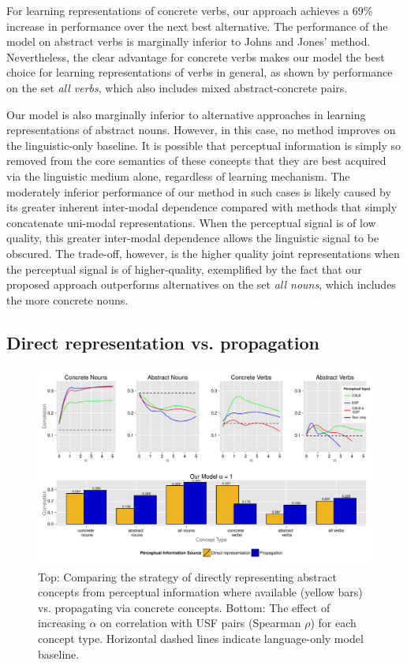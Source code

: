 For learning representations of concrete verbs, our approach achieves a 69\% increase in performance over the next best alternative. The performance of the model on abstract verbs is marginally inferior to Johns and Jones' method. Nevertheless, the clear advantage for concrete verbs makes our model the best choice for learning representations of verbs in general, as shown by performance on the set \emph{all verbs}, which also includes mixed abstract-concrete pairs. 

Our model is also marginally inferior to alternative approaches in learning representations of abstract nouns. However, in this case, no method improves on the linguistic-only baseline. It is possible that perceptual information is simply so removed from the core semantics of these concepts that they are best acquired via the linguistic medium alone, regardless of learning mechanism. The moderately inferior performance of our method in such cases is likely caused by its greater inherent inter-modal dependence compared with methods that simply concatenate uni-modal representations. When the perceptual signal is of low quality, this greater inter-modal dependence allows the linguistic signal to be obscured. The trade-off, however, is the higher quality joint representations when the perceptual signal is of higher-quality, exemplified by the fact that our proposed approach outperforms alternatives on the set \emph{all nouns}, which includes the more concrete nouns. 

\subsection{Direct representation vs. propagation}

 \begin{figure}[t] 

\includegraphics[width = \textwidth]{Chapter_3/Graph_2_EMNLP2014}  

\caption{\label{repprop} Top: Comparing the strategy of directly representing abstract concepts from perceptual information where available (yellow bars) vs. propagating via concrete concepts. Bottom: The effect of increasing \(\alpha\) on correlation with USF pairs (Spearman \(\rho\)) for each concept type. Horizontal dashed lines indicate language-only model baseline.}

\end{figure}

